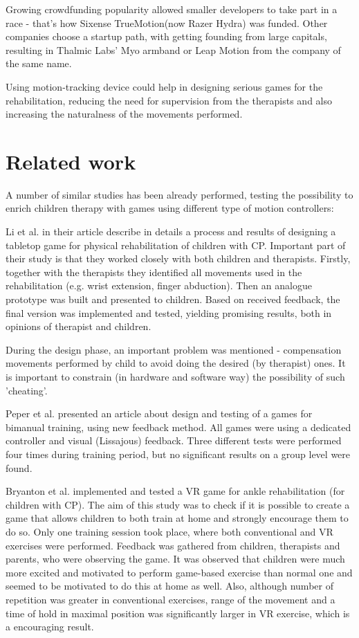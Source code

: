 Growing crowdfunding popularity allowed smaller developers to take part in a race - that's how Sixense TrueMotion(now Razer Hydra)\cite{hydra} was funded. Other companies choose a startup path, with getting founding from large capitals, resulting in Thalmic Labs' Myo armband \cite{myo} or Leap Motion\cite{Leap} from the company of the same name. 

Using motion-tracking device could help in designing serious games for the rehabilitation, reducing the need for supervision from the therapists and also increasing the naturalness of the movements performed. 

\section{Related work}
A number of similar studies has been already performed, testing the possibility to enrich children therapy with games using different type of motion controllers:

Li et al. in their article \cite{tabletop} describe in details a process and results of designing a tabletop game for physical rehabilitation of children with CP. Important part of their study is that they worked closely with both children and therapists. Firstly, together with the therapists they identified all movements used in the rehabilitation (e.g. wrist extension, finger abduction). Then an analogue prototype was built and presented to children. Based on received feedback, the final version was implemented and tested, yielding promising results, both in opinions of therapist and children. 

During the design phase, an important problem was mentioned - compensation movements performed by child to avoid doing the desired (by therapist) ones. It is important to constrain (in hardware and software way) the possibility of such 'cheating'.

Peper et al. \cite{bimanual} presented an article about design and testing of a games for bimanual training, using new feedback method. All games were using a dedicated controller and visual (Lissajous) feedback. Three different tests were performed four times during training period, but no significant results on a group level were found. 

Bryanton et al. \cite{vr_cp} implemented and tested a VR game for ankle rehabilitation (for children with CP). The aim of this study was to check if it is possible to create a game that allows children to both train at home and strongly encourage them to do so. Only one training session took place, where both conventional and VR exercises were performed. Feedback was gathered from children, therapists and parents, who were observing the game. It was observed that children were much more excited and motivated to perform game-based exercise than normal one and seemed to be motivated to do this at home as well. Also, although number of repetition was greater in conventional exercises, range of the movement and a time of hold in maximal position was significantly larger in VR exercise, which is a encouraging result.

